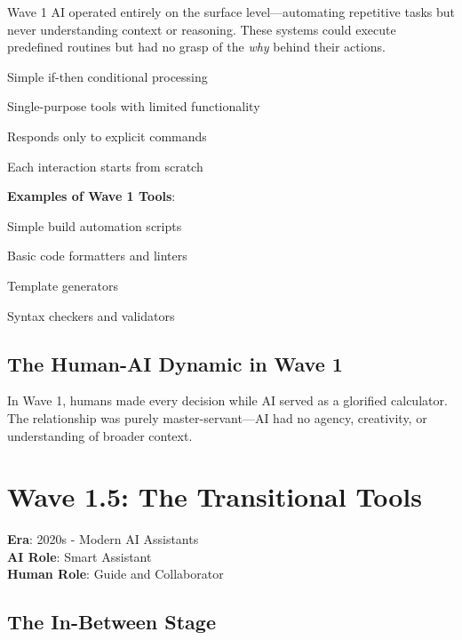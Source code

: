 Wave 1 AI operated entirely on the surface level—automating repetitive tasks but never understanding context or reasoning. These systems could execute predefined routines but had no grasp of the \textit{why} behind their actions.

\begin{description}[leftmargin=3cm,labelwidth=2.5cm]
    \item[\textbf{Rule-based Logic}] Simple if-then conditional processing
    \item[\textbf{Narrow Scope}] Single-purpose tools with limited functionality
    \item[\textbf{Reactive Behavior}] Responds only to explicit commands
    \item[\textbf{Zero Context}] Each interaction starts from scratch
\end{description}

\textbf{Examples of Wave 1 Tools}:
\begin{compactlist}
    \item Simple build automation scripts
    \item Basic code formatters and linters
    \item Template generators
    \item Syntax checkers and validators
\end{compactlist}

\subsection{The Human-AI Dynamic in Wave 1}
\label{subsec:wave-1-dynamic}

In Wave 1, humans made every decision while AI served as a glorified calculator. The relationship was purely master-servant—AI had no agency, creativity, or understanding of broader context.

\section{Wave 1.5: The Transitional Tools}
\label{sec:wave-1-5}

\textbf{Era}: 2020s - Modern AI Assistants\\
\textbf{AI Role}: Smart Assistant\\
\textbf{Human Role}: Guide and Collaborator

\subsection{The In-Between Stage}
\label{subsec:wave-1-5-stage}

